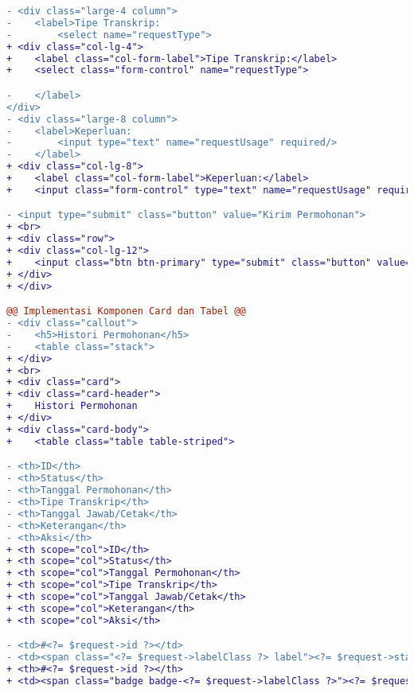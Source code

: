 \begin{lstlisting}[language=diff, caption=Kode untuk Halaman Cetak Transkrip Request, label=Entri, basicstyle=\ttfamily, frame=single,
columns=fullflexible, keepspaces=true, breaklines=true]
- <div class="large-4 column">
-    <label>Tipe Transkrip:
-        <select name="requestType">
+ <div class="col-lg-4">
+    <label class="col-form-label">Tipe Transkrip:</label>
+    <select class="form-control" name="requestType">

-    </label>
</div>
- <div class="large-8 column">
-    <label>Keperluan:
-        <input type="text" name="requestUsage" required/>
-    </label>
+ <div class="col-lg-8">
+    <label class="col-form-label">Keperluan:</label>
+    <input class="form-control" type="text" name="requestUsage" required/>

- <input type="submit" class="button" value="Kirim Permohonan">
+ <br>
+ <div class="row">
+ <div class="col-lg-12">
+    <input class="btn btn-primary" type="submit" class="button" value="Kirim Permohonan">
+ </div>
+ </div>

@@ Implementasi Komponen Card dan Tabel @@
- <div class="callout">
-    <h5>Histori Permohonan</h5>
-    <table class="stack">
+ </div>
+ <br>
+ <div class="card">
+ <div class="card-header">
+    Histori Permohonan
+ </div>
+ <div class="card-body">
+    <table class="table table-striped">

- <th>ID</th>
- <th>Status</th>
- <th>Tanggal Permohonan</th>
- <th>Tipe Transkrip</th>
- <th>Tanggal Jawab/Cetak</th>
- <th>Keterangan</th>
- <th>Aksi</th>
+ <th scope="col">ID</th>
+ <th scope="col">Status</th>
+ <th scope="col">Tanggal Permohonan</th>
+ <th scope="col">Tipe Transkrip</th>
+ <th scope="col">Tanggal Jawab/Cetak</th>
+ <th scope="col">Keterangan</th>
+ <th scope="col">Aksi</th>

- <td>#<?= $request->id ?></td>
- <td><span class="<?= $request->labelClass ?> label"><?= $request->status ?></span></td>
+ <th>#<?= $request->id ?></th>
+ <td><span class="badge badge-<?= $request->labelClass ?>"><?= $request->status ?></span></td>
\end{lstlisting}


